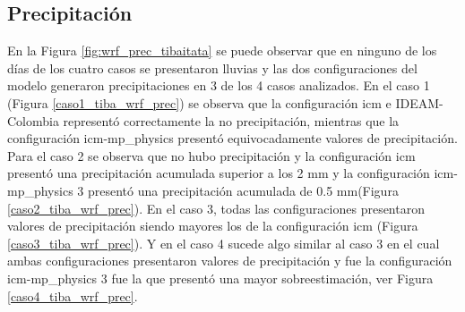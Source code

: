 \subsection{Precipitación}

En la Figura \ref{fig:wrf_prec_tibaitata} se puede observar que en ninguno de los días de los cuatro casos se presentaron lluvias y las dos configuraciones del modelo generaron precipitaciones en 3 de los 4 casos analizados. En el caso 1 (Figura \ref{caso1_tiba_wrf_prec}) se observa que la configuración icm e IDEAM-Colombia representó correctamente la no precipitación, mientras que la configuración icm-mp\_physics presentó equivocadamente valores de precipitación. Para el caso 2 se observa que no hubo precipitación y la configuración icm presentó una precipitación acumulada superior a los 2 mm y la configuración icm-mp\_physics 3 presentó una precipitación acumulada de 0.5 mm(Figura \ref{caso2_tiba_wrf_prec}). En el caso 3, todas las configuraciones presentaron valores de precipitación siendo mayores los de la configuración icm (Figura \ref{caso3_tiba_wrf_prec}). Y en el caso 4 sucede algo similar al caso 3 en el cual ambas configuraciones presentaron valores de precipitación y fue la configuración icm-mp\_physics 3 fue la que presentó una mayor sobreestimación, ver Figura \ref{caso4_tiba_wrf_prec}.\\


